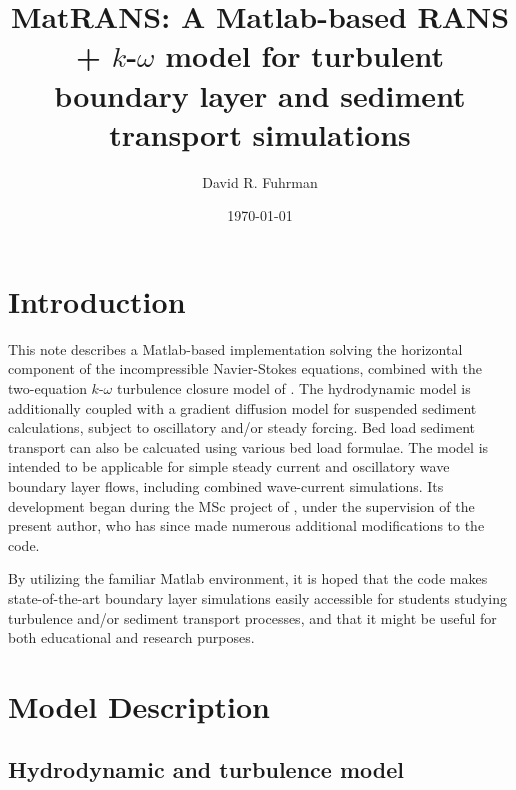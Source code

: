 \documentclass[12pt]{article}
\begin{document}
\title{MatRANS: A Matlab-based RANS + $k$-$\omega$ model for turbulent
  boundary layer and sediment transport simulations} \author{David
  R. Fuhrman} \date{\today} \maketitle



\section{Introduction}

This note describes a Matlab-based implementation solving the
horizontal component of the incompressible Navier-Stokes equations,
combined with the two-equation $k$-$\omega$ turbulence closure model
of \cite{Wilcox2006,Wilcox2008}.  The hydrodynamic model is
additionally coupled with a gradient diffusion model for suspended
sediment calculations, subject to oscillatory and/or steady forcing.
Bed load sediment transport can also be calcuated using various bed
load formulae.  The model is intended to be applicable for simple
steady current and oscillatory wave boundary layer flows, including
combined wave-current simulations.  Its development began during the
MSc project of \cite{SchloerSterner2009}, under the supervision of the
present author, who has since made numerous additional modifications
to the code.  

By utilizing the familiar Matlab environment, it is hoped that the
code makes state-of-the-art boundary layer simulations easily
accessible for students studying turbulence and/or sediment transport
processes, and that it might be useful for both educational and
research purposes.


\section{Model Description}
\label{sec:ModelDescription}

\subsection{Hydrodynamic and turbulence model}
\end{document}
